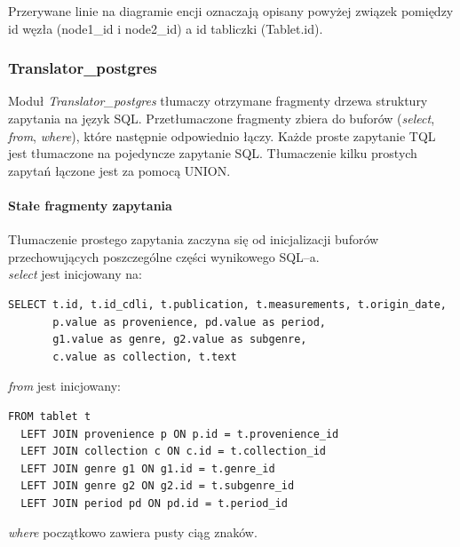 Przerywane linie na diagramie encji oznaczają opisany powyżej związek pomiędzy id węzła (node1\_id i node2\_id) 
a id tabliczki (Tablet.id).


 

\subsubsection{Translator\_postgres}
Moduł \textit{Translator\_postgres} tłumaczy otrzymane fragmenty drzewa struktury zapytania na język SQL. Przetłumaczone fragmenty zbiera do buforów 
(\textit{select}, \textit{from}, \textit{where}), które następnie odpowiednio łączy.
Każde proste zapytanie TQL jest tłumaczone na pojedyncze zapytanie SQL. Tłumaczenie kilku prostych zapytań
łączone jest za pomocą UNION.

\paragraph{Stałe fragmenty zapytania}
Tłumaczenie prostego zapytania zaczyna się od inicjalizacji buforów przechowujących poszczególne części wynikowego SQL--a.
\vspace{5pt}\\
\textit{select} jest inicjowany na:
\begin{verbatim}
SELECT t.id, t.id_cdli, t.publication, t.measurements, t.origin_date, 
       p.value as provenience, pd.value as period,
       g1.value as genre, g2.value as subgenre, 
       c.value as collection, t.text
\end{verbatim}
\textit{from} jest inicjowany:
\begin{verbatim}
FROM tablet t
  LEFT JOIN provenience p ON p.id = t.provenience_id
  LEFT JOIN collection c ON c.id = t.collection_id
  LEFT JOIN genre g1 ON g1.id = t.genre_id
  LEFT JOIN genre g2 ON g2.id = t.subgenre_id
  LEFT JOIN period pd ON pd.id = t.period_id
\end{verbatim}
\textit{where} początkowo zawiera pusty ciąg znaków.



